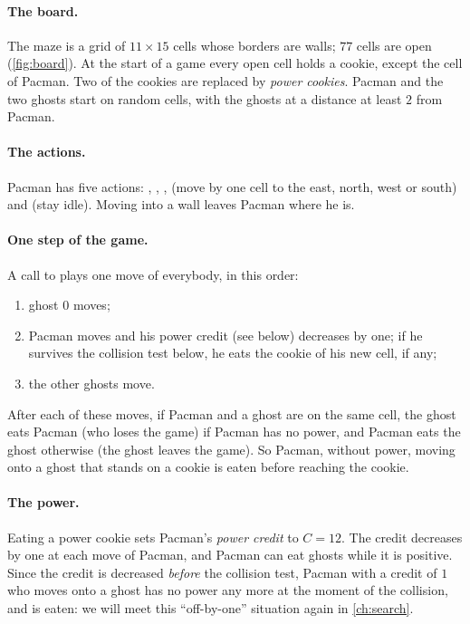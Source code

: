 \paragraph{The board.} The maze  is a grid of
$11 \times 15$ cells whose borders are walls; $77$ cells are open
(\cref{fig:board}). At the start of a game every open cell holds a cookie,
except the cell of Pacman. Two of the cookies are replaced by \emph{power
cookies}. Pacman and the two ghosts start on random cells, with the ghosts
at a distance at least $2$ from Pacman.

\paragraph{The actions.} Pacman has five actions: , ,
,  (move by one cell to the east, north, west or south) and
 (stay idle). Moving into a wall leaves Pacman where he is.

\paragraph{One step of the game.} A call to  plays one
move of everybody, in this order:
\begin{enumerate}[nosep]
  \item ghost $0$ moves;
  \item Pacman moves and his power credit (see below) decreases by one;
    if he survives the collision test below, he eats the cookie of his
    new cell, if any;
  \item the other ghosts move.
\end{enumerate}
After each of these moves, if Pacman and a ghost are on the same cell, the
ghost eats Pacman (who loses the game) if Pacman has no power, and Pacman
eats the ghost otherwise (the ghost leaves the game). So Pacman, without
power, moving onto a ghost that stands on a cookie is eaten before
reaching the cookie.

\paragraph{The power.} Eating a power cookie sets Pacman's \emph{power
credit} to $C = 12$. The credit decreases by one at each move of Pacman, and
Pacman can eat ghosts while it is positive. Since the credit is decreased
\emph{before} the collision test, Pacman with a credit of $1$ who moves onto
a ghost has no power any more at the moment of the collision, and is eaten:
we will meet this ``off-by-one'' situation again in \cref{ch:search}.


